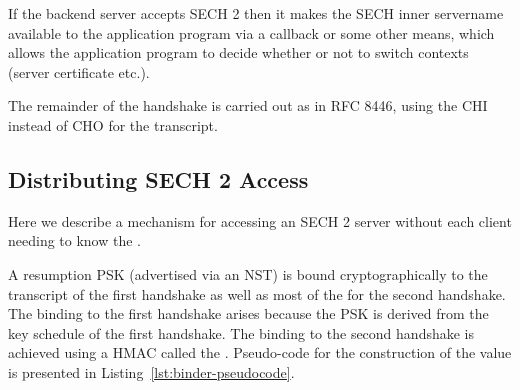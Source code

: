 

If the backend server accepts SECH 2 then it makes the SECH inner servername available to the application program via a callback or some other means, which allows the application program to decide whether or not to switch contexts (server certificate etc.).

The remainder of the handshake is carried out as in RFC 8446,
using the \ac{CHI} instead of \ac{CHO} for the transcript.

\subsection{Distributing SECH 2 Access}
Here we describe a mechanism for accessing an \ac{SECH} 2 server
without each client needing to know the \varsechlongtermkey{}.

A resumption \ac{PSK} (advertised via an \ac{NST})
is bound cryptographically to the transcript of the first handshake as well as most of the  for the second handshake.
The binding to the first handshake arises because the \ac{PSK} is derived from the key schedule
of the first handshake.
The binding to the second handshake is achieved using a \ac{HMAC} called the .
Pseudo-code for the construction of the  value is presented in Listing~\ref{lst:binder-pseudocode}.

